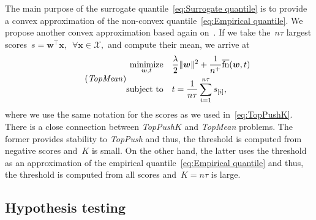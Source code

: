 \documentclass[11pt,a4paper]{article}
\theoremstyle{definition}
\newcommand{\norm}[1]{\|#1\|}
\newcommand{\minimize}{\operatorname*{minimize}}
\newcommand{\st}{\operatorname{subject\ to}}
\newcommand{\X}{\mathcal{X}}
\newcommand{\fns}{\overline{\textnormal{fn}}}
\newcommand{\toppush}{\textit{TopPush}\xspace}
\newcommand{\toppushk}{\textit{TopPush$K$}\xspace}
\newcommand{\topmean}{\textit{TopMean}\xspace}
\begin{document}
The main purpose of the surrogate quantile~\eqref{eq:Surrogate quantile} is to provide a convex approximation of the non-convex quantile~\eqref{eq:Empirical quantile}. We propose another convex approximation based again on~\cite{lapin2015top}. If we take the~$n\tau$ largest scores~$s = \bm{w}^\top \bm{x},$~$\forall \bm{x} \in \X,$ and compute their mean, we arrive at
\begin{equation}\label{eq:TopMean}\tag{\topmean}
  \begin{aligned}
    \minimize_{\bm{w}, t} & \quad \frac{\lambda}{2}\norm{\bm{w}}^2 + \frac{1}{n^+}\fns(\bm{w},t) \\
    \st                   & \quad t = \frac{1}{n\tau}\sum_{i=1}^{n\tau}s_{[i]},
  \end{aligned}
\end{equation}
where we use the same notation for the scores as we used in~\eqref{eq:TopPushK}. There is a close connection between \toppushk and \topmean problems. The former provides stability to \toppush and thus, the threshold is computed from negative scores and~$K$ is small. On the other hand, the latter uses the threshold as an approximation of the empirical quantile~\eqref{eq:Empirical quantile} and thus, the threshold is computed from all scores and~$K = n\tau$ is large.


\subsection{Hypothesis testing}\label{subsec:Hypothesis testing}
\end{document}

